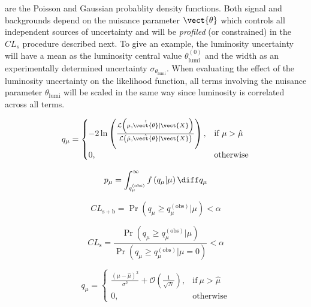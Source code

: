  are the Poisson and Gaussian probablity density functions. 
Both signal and backgrounds depend on the nuisance parameter
$\vect{\theta}$ which controls all independent sources of uncertainty 
and will be \textit{profiled} (or constrained) in the $CL_s$ procedure
described next.
To give an example, the luminosity uncertainty will have a mean 
as the luminosity central value $ \theta_{\text{lumi}}^{\left(0\right)}$ and the 
width as an experimentally determined 
uncertainty $\sigma_{\theta_{\text{lumi}}}$. When evaluating the effect of the 
luminosity uncertainty on the likelihood function, all terms involving the 
nuisance parameter $\theta_{\text{lumi}}$ will be scaled in the same way 
since luminosity is correlated across all terms.




\begin{equation}
q_{\mu} = 
\begin{cases}
  -2\ln\left(
  \frac
      {\mathcal{L} \left( \mu, \hat{\hat{\vect{\theta}}} \rvert \vect{X} \right)}
      {\mathcal{L} \left( \hat{\mu}, \hat{\vect{\theta}} \rvert \vect{X} \right)}
 \right), & \text{if}\ \mu > \hat{\mu} \\
      0, & \text{otherwise}
    \end{cases}
\end{equation}


\begin{equation}
p_{\mu} = \int_{q_{\mu}^{\left(\text{obs}\right)}}^{\infty} f\left(q_{\mu} \rvert \mu\right) \diff q_{\mu}
\end{equation}


\begin{equation}
  CL_\mathrm{s+b}  = \Pr\left( q_{\mu} \geq q_{\mu}^{\left(\text{obs}\right)}
  \rvert \mu
  \right) < \alpha
\end{equation}


\begin{equation}
  CL_\mathrm{s}  = \frac
  {\Pr\left( q_{\mu} \geq q_{\mu}^{\left(\text{obs}\right)}\rvert \mu \right)}
  {\Pr\left( q_{\mu} \geq q_{\mu}^{\left(\text{obs}\right)}\rvert \mu = 0 \right)}
< \alpha
\end{equation}


\begin{equation}
  q_{\mu} = 
  \begin{cases}
    \frac{\left(\mu - \hat{\mu}\right)^2}{\sigma^2} + \mathcal{O}\left(\frac{1}{\sqrt{N}}\right)
    , & \text{if}\ \mu > \hat{\mu} \\
    0, & \text{otherwise}
  \end{cases}
\end{equation}
